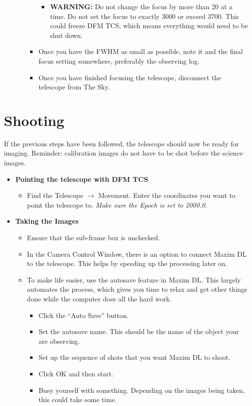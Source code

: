 \documentclass[letterpaper, 12pt]{report}
\begin{document}
\begin{itemize}
\begin{itemize}
\begin{itemize}
			\begin{itemize}
				\item \large \textbf{WARNING:} Do not change the focus by more than 20 at a time. Do not set the focus to exactly 3000 or exceed 3700. This could freeze DFM TCS, which means everything would need to be shut down.
			\end{itemize}
			\item Once you have the FWHM as small as possible, note it and the final focus setting somewhere, preferably the observing log.
			\item Once you have finished focusing the telescope, disconnect the telescope from The Sky.
		\end{itemize}
	\end{itemize}
\end{itemize}

\chapter{Shooting}\label{ch:shooting}

If the previous steps have been followed, the telescope should now be ready for imaging. Reminder: calibration images do not have to be shot before the science images.

\begin{itemize}
	\item \large \textbf{Pointing the telescope with DFM TCS}
	\begin{itemize}
		\item Find the Telescope $\rightarrow$ Movement. Enter the coordinates you want to point the telescope to. {\large \emph{Make sure the Epoch is set to 2000.0.}}
	\end{itemize}
	\item \large \textbf{Taking the Images}
	\begin{itemize}
		\item Ensure that the sub-frame box is unchecked.
		\item In the Camera Control Window, there is an option to connect Maxim DL to the telescope. This helps by speeding up the processing later on.
		\item To make life easier, use the autosave feature in Maxim DL. This largely automates the process, which gives you time to relax and get other things done while the computer does all the hard work.
		\begin{itemize}
			\item Click the ``Auto Save'' button.
			\item Set the autosave name. This should be the name of the object your are observing.
			\item Set up the sequence of shots that you want Maxim DL to shoot.
			\item Click OK and then start.
			\item Busy yourself with something. Depending on the images being taken, this could take some time.
		\end{itemize}
	\end{itemize}
\end{itemize}
\end{document}
